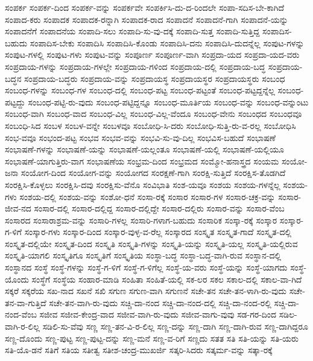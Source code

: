 {ಸಂಪರ್ಕ
ಸಂಪರ್ಕ-ದಿಂದ
ಸಂಪರ್ಕ-ವನ್ನು
ಸಂಪರ್ಕವೇ
ಸಂಪರ್ಕಿಸಿ-ದು-ದ-ರಿಂದಲೇ
ಸಂಪಾ-ಸದಿಸ-ಬೇ-ಕಾಗಿದೆ
ಸಂಪಾದ-ಕರು
ಸಂಪಾದಕ
ಸಂಪಾದಕ-ರನ್ನಾಗಿ
ಸಂಪಾದಕ-ರಾದ
ಸಂಪಾದನೆ
ಸಂಪಾದನೆ-ಗಾಗಿ
ಸಂಪಾದನೆ-ಯನ್ನು
ಸಂಪಾದನೆಗೆ
ಸಂಪಾದನೆಯ
ಸಂಪಾದಿ-ಸಲು
ಸಂಪಾದಿ-ಸು-ವು-ದಕ್ಕೆ
ಸಂಪಾದಿ-ಸುತ್ತ
ಸಂಪಾದಿ-ಸುತ್ತಿದ್ದ
ಸಂಪಾದಿಸ-ಬಹುದು
ಸಂಪಾದಿಸ-ಬೇಕು
ಸಂಪಾದಿಸಿ
ಸಂಪಾದಿಸಿ-ಕೊಂಡು
ಸಂಪಾದಿಸಿ-ದನು
ಸಂಪಾದಿಸಿ-ದುದನ್ನೆಲ್ಲ
ಸಂಪುಟ-ಗಳನ್ನು
ಸಂಪುಟ-ಗಳಲ್ಲಿ
ಸಂಪುಟ-ಗಳು
ಸಂಪುಟ-ವನ್ನು
ಸಂಪೂರ್ಣ
ಸಂಪೂರ್ಣ-ವಾಗಿ
ಸಂಪ್ರದಾ-ಯದ
ಸಂಪ್ರದಾ-ಯದ-ವರು
ಸಂಪ್ರದಾಯ-ಗಳನ್ನು
ಸಂಪ್ರದಾಯ-ಗಳಲ್ಲೇ
ಸಂಪ್ರದಾಯ-ಗಳಿಂದ
ಸಂಪ್ರದಾಯ-ದಲ್ಲಿ
ಸಂಪ್ರದಾಯ-ಬದ್ಧ
ಸಂಪ್ರದಾಯ-ಬದ್ಧನ
ಸಂಪ್ರದಾಯ-ಬದ್ಧರು
ಸಂಪ್ರದಾಯ-ವನ್ನು
ಸಂಪ್ರದಾಯಸ್ಥ
ಸಂಪ್ರದಾಯಸ್ಥರ
ಸಂಪ್ರದಾಯಸ್ಥರು
ಸಂಬಂಧ
ಸಂಬಂಧ-ಗಳನ್ನು
ಸಂಬಂಧ-ಗಳ
ಸಂಬಂಧ-ದಲ್ಲಿ
ಸಂಬಂಧ-ಪಟ್ಟ
ಸಂಬಂಧ-ಪಟ್ಟಂತೆ
ಸಂಬಂಧ-ಪಟ್ಟದ್ದನ್ನೆಲ್ಲ
ಸಂಬಂಧ-ಪಟ್ಟದ್ದು
ಸಂಬಂಧ-ಪಟ್ಟಿ-ರು-ವುದು
ಸಂಬಂಧ-ಪಟ್ಟಿದ್ದನ್ನೂ
ಸಂಬಂಧ-ಮೂರ್ತಿಯ
ಸಂಬಂಧ-ವನ್ನು
ಸಂಬಂಧ-ವನ್ನುಂಟು
ಸಂಬಂಧ-ವಾಗಿ
ಸಂಬಂಧ-ವಾದ
ಸಂಬಂಧ-ವಿಲ್ಲ
ಸಂಬಂಧ-ವಿಲ್ಲ-ವೆಂದೂ
ಸಂಬಂಧ-ವೇನು
ಸಂಬಂಧದ
ಸಂಬಂಧವೂ
ಸಂಬಂಧಿ-ಸಿದ
ಸಂಬಳ
ಸಂಬಳ-ವನ್ನೇ
ಸಂಬಳವೂ
ಸಂಬೋಧಿ-ಸಿ-ದರು
ಸಂಬೋಧಿ-ಸುತ್ತಿ-ರು-ವ-ರಲ್ಲ
ಸಂಬೋಧಿಸಿ
ಸಂಭ-ವವೂ
ಸಂಭಂದ-ಪಟ್ಟ
ಸಂಭವ
ಸಂಭವ-ವನ್ನು
ಸಂಭವಿ-ಸು-ವು-ದಿಲ್ಲ
ಸಂಭವಿಸ-ಬಹುದೆ
ಸಂಭಾಷಣೆ
ಸಂಭಾಷಣೆ-ಗಳನ್ನು
ಸಂಭಾಷಣೆ-ಯನ್ನು
ಸಂಭಾಷಣೆ-ಯಲ್ಲಂತೂ
ಸಂಭಾಷಣೆ-ಯಲ್ಲಿ
ಸಂಭಾಷಣೆ-ಯಲ್ಲಿಯೂ
ಸಂಭಾಷಣೆ-ಯಾಗುತ್ತಿರು-ವಾಗ
ಸಂಭಾಷಣೆಯ
ಸಂಭ್ರಮ-ದಿಂದ
ಸಂಭ್ರಮದ
ಸಂಮ್ಮೋ-ಹನಾಸ್ತ್ರದ
ಸಂಯಮ
ಸಂಯೋ-ಜನಾ
ಸಂಯೋಗ-ದಿಂದ
ಸಂಯೋಗ-ವನ್ನು
ಸಂಯೋಗದ
ಸಂರಕ್ಷಣೆ-ಗಾಗಿ
ಸಂರಕ್ಷಿ-ಸುತ್ತಿದೆ
ಸಂರಕ್ಷಿಸ-ತೊಡಗಿದೆ
ಸಂರಕ್ಷಿಸಿ-ಕೊಳ್ಳಲು
ಸಂರಕ್ಷಿಸಿ-ದವು
ಸಂರಕ್ಷಿಸು-ವೆನೊ
ಸಂವಿಭಾತಿ
ಸಂಶ-ಯವೂ
ಸಂಶಯ
ಸಂಶಯ-ಗಳನ್ನೆಲ್ಲ
ಸಂಶಯ-ಗಳು
ಸಂಶಯ-ದಲ್ಲಿ
ಸಂಶಯ-ವನ್ನು
ಸಂಶೋ-ಧನೆ
ಸಂಸಾ-ರಕ್ಕೆ
ಸಂಸಾರ
ಸಂಸಾರ-ಗಳ
ಸಂಸಾರ-ಚಕ್ರ-ವನ್ನು
ಸಂಸಾರ-ಜೀವ-ನದ
ಸಂಸಾರ-ದಲ್ಲಿ
ಸಂಸಾರ-ದಲ್ಲಿದ್ದ
ಸಂಸಾರ-ದಲ್ಲಿದ್ದೇ
ಸಂಸಾರ-ದಲ್ಲಿರು
ಸಂಸಾರ-ವನ್ನು
ಸಂಸಾರ-ವೆಂಬ
ಸಂಸಾರದ
ಸಂಸಾರಾಶ್ರಮ-ವನ್ನು
ಸಂಸಾರಿ-ಗಳಲ್ಲ
ಸಂಸಾರಿ-ಗಳಾಗ-ಬಹುದು
ಸಂಸಾರಿಕ
ಸಂಸ್ಕಾ-ರಕ್ಕೆ
ಸಂಸ್ಕಾರ
ಸಂಸ್ಕಾರ-ಗ-ಳಿಗೆ
ಸಂಸ್ಕಾರ-ಗಳು
ಸಂಸ್ಕಾರ-ದಿಂದ
ಸಂಸ್ಕಾರ-ವುಳ್ಳ-ವ-ರೆಲ್ಲ
ಸಂಸ್ಕಾರದ
ಸಂಸ್ಕೃತ
ಸಂಸ್ಕೃತ-ಗಾದೆ
ಸಂಸ್ಕೃತ-ದಲ್ಲಿ
ಸಂಸ್ಕೃತ-ದಲ್ಲಿಯೇ
ಸಂಸ್ಕೃತ-ದಿಂದ
ಸಂಸ್ಕೃತಿ
ಸಂಸ್ಕೃತಿ-ಗಳನ್ನು
ಸಂಸ್ಕೃತಿ-ಯನ್ನು
ಸಂಸ್ಕೃತಿ-ಯಲ್ಲ
ಸಂಸ್ಕೃತಿ-ಯಲ್ಲಿರುವ
ಸಂಸ್ಕೃತಿ-ಯಾಗಲಿ
ಸಂಸ್ಕೃತಿಗೂ
ಸಂಸ್ಕೃತಿಗೆ
ಸಂಸ್ಕೃತಿಯ
ಸಂಸ್ಥಾ-ಬದ್ಧ
ಸಂಸ್ಥಾ-ಬದ್ಧ-ವಾಗಿ-ರುವ
ಸಂಸ್ಥಾನ-ದಲ್ಲಿ
ಸಂಸ್ಥಾನದ
ಸಂಸ್ಥೆ
ಸಂಸ್ಥೆ-ಗಳನ್ನು
ಸಂಸ್ಥೆ-ಗ-ಳಿಗೆ
ಸಂಸ್ಥೆ-ಗ-ಳಿಗೆಲ್ಲ
ಸಂಸ್ಥೆ-ಯ-ವರು
ಸಂಸ್ಥೆ-ಯನ್ನು
ಸಂಸ್ಥೆ-ಯಾಗದು
ಸಂಸ್ಥೆ-ಯೊಂದು
ಸಂಸ್ಥೆಗೆ
ಸಂಸ್ಥೆಯ
ಸಂಹಾರ-ಮಾಡಿ
ಸಂಹಿತಾ
ಸಂಹಿತೆ-ಯಲ್ಲಿ
ಸಕ-ಲರ
ಸಕಲ
ಸಕಾಲ-ದಲ್ಲಿ
ಸಕಾಲ-ವಾ-ಗಿದೆ
ಸಕ್ಕರೆ
ಸಕ್ಕರೆಯ
ಸಖ-ನಾದ
ಸಖನೆ
ಸಖಿ
ಸಗುಣ
ಸಗುಣ-ವಾಗಿ
ಸಗುಣನೆ
ಸಚೇ-ತನ
ಸಚೇ-ತನ-ಳಾಗಿ-ರು-ವುದು
ಸಚೇ-ತನ-ವಾ-ಗುತ್ತಿದೆ
ಸಚೇ-ತನ-ವಾಗಿ-ರು-ವುದು
ಸಚ್ಚಿ-ದಾ-ನಂದ
ಸಚ್ಚಿ-ದಾ-ನಂದ-ದಲ್ಲಿ
ಸಚ್ಚಿ-ದಾ-ನಂದ-ರಲ್ಲಿ
ಸಚ್ಚಿ-ದಾ-ನಂದ-ವೆಂಬ
ಸಜೀವ
ಸಜೀವ-ಕೇಂದ್ರ-ವಾದ
ಸಜೀವ-ವಾಗಿ-ರು-ವುದು
ಸಜೀವ-ವಾಗು-ವುವು
ಸಡ-ಗರ-ದಿಂದ
ಸಡಿಲ-ವಾಗಿ-ರ-ಲಿಲ್ಲ
ಸಡಿಲಿ-ಸು-ವೆವು
ಸಣ್ಣ
ಸಣ್ಣ-ತನ-ವಿ-ರ-ಲಿಲ್ಲ
ಸಣ್ಣ-ದನ್ನು
ಸಣ್ಣ-ದಾಗಿ
ಸಣ್ಣ-ದಾಗಿ-ರುವ
ಸಣ್ಣ-ದಾಗಿದ್ದರೂ
ಸಣ್ಣ-ದೊಂದು
ಸಣ್ಣ-ಪುಟ್ಟ
ಸಣ್ಣ-ಪುಟ್ಟ-ದನ್ನು
ಸಣ್ಣ-ಮನೆ
ಸಣ್ಣ-ವ-ರಿಗೆ
ಸಣ್ಣದು
ಸತತ
ಸತಿ
ಸತಿ-ಯನ್ನು
ಸತಿ-ಯರು
ಸತಿ-ಯೊ-ಡನೆ
ಸತಿಗೆ
ಸತಿಯ
ಸತೀತ್ವ
ಸತೀಶ-ಚಂದ್ರ-ಮುಖರ್ಜಿ
ಸತ್ಕರಿ-ಸಿದರು
ಸತ್ಕರ್ಮ-ವನ್ನು
ಸತ್ಕಾ-ರಕ್ಕೆ
}

